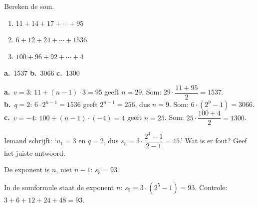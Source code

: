 \begin{oefeningen}
\begin{oefening}[1]\label{oef:h3-aantal}
Bereken de som.
\begin{enumerate}
  \item $11 + 14 + 17 + \cdots + 95$
  \item $6 + 12 + 24 + \cdots + 1536$
  \item $100 + 96 + 92 + \cdots + 4$
\end{enumerate}
\begin{solution}
\textbf{a.}~1537 \quad \textbf{b.}~3066 \quad \textbf{c.}~1300
\end{solution}
\begin{fullsolution}
\textbf{a.}~$v=3$: $11+(n-1)\cdot 3=95$ geeft $n=29$. Som: $29\cdot\dfrac{11+95}{2}=1537$.\\
\textbf{b.}~$q=2$: $6\cdot 2^{n-1}=1536$ geeft $2^{n-1}=256$, dus $n=9$. Som: $6\cdot(2^9-1)=3066$.\\
\textbf{c.}~$v=-4$: $100+(n-1)\cdot(-4)=4$ geeft $n=25$. Som: $25\cdot\dfrac{100+4}{2}=1300$.
\end{fullsolution}
\end{oefening}

\begin{oefening}[1]
Iemand schrijft: `$u_1 = 3$ en $q = 2$, dus $s_5 = 3 \cdot \dfrac{2^4 - 1}{2 - 1} = 45$.' Wat is er fout? Geef het juiste antwoord.
\begin{solution}
De exponent is $n$, niet $n-1$: $s_5=93$.
\end{solution}
\begin{fullsolution}
In de somformule staat de exponent $n$: $s_5=3\cdot(2^5-1)=93$. Controle: $3+6+12+24+48=93$.
\end{fullsolution}
\end{oefening}


\end{oefeningen}
